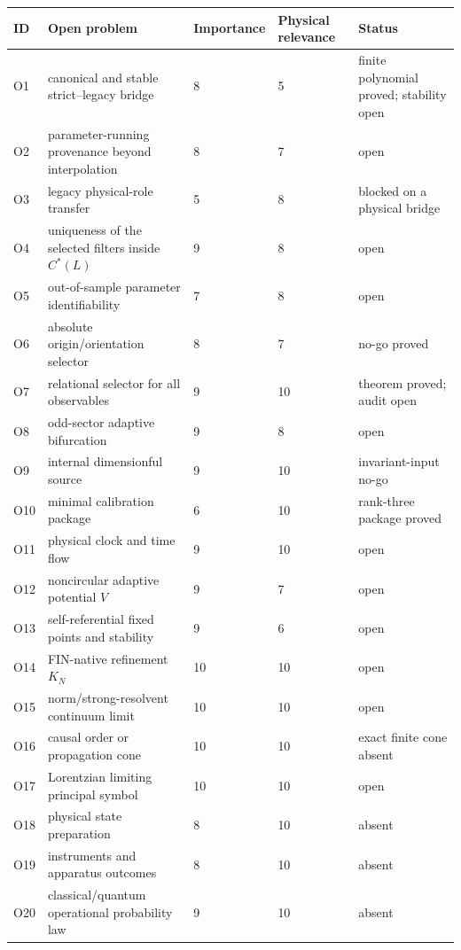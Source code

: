 \documentclass[11pt,a4paper,openany]{report}
\begin{document}
\begin{center}
\begingroup\footnotesize
\setlength{\tabcolsep}{3.5pt}
\renewcommand{\arraystretch}{1.16}
\begin{longtable}{@{}p{}p{}p{}p{}p{}@{}}
\toprule
\textbf{ID} & \textbf{Open problem} & \textbf{Importance} & \textbf{Physical relevance} & \textbf{Status} \\
\midrule
\endhead
O1 & canonical and stable strict–legacy bridge & 8 & 5 & finite polynomial proved; stability open \\
O2 & parameter-running provenance beyond interpolation & 8 & 7 & open \\
O3 & legacy physical-role transfer & 5 & 8 & blocked on a physical bridge \\
O4 & uniqueness of the selected filters inside \(C^*(L)\) & 9 & 8 & open \\
O5 & out-of-sample parameter identifiability & 7 & 8 & open \\
O6 & absolute origin/\allowbreak{}orientation selector & 8 & 7 & no-go proved \\
O7 & relational selector for all observables & 9 & 10 & theorem proved; audit open \\
O8 & odd-sector adaptive bifurcation & 9 & 8 & open \\
O9 & internal dimensionful source & 9 & 10 & invariant-input no-go \\
O10 & minimal calibration package & 6 & 10 & rank-three package proved \\
O11 & physical clock and time flow & 9 & 10 & open \\
O12 & noncircular adaptive potential \(V\) & 9 & 7 & open \\
O13 & self-referential fixed points and stability & 9 & 6 & open \\
O14 & FIN-native refinement \(K_N\) & 10 & 10 & open \\
O15 & norm/\allowbreak{}strong-resolvent continuum limit & 10 & 10 & open \\
O16 & causal order or propagation cone & 10 & 10 & exact finite cone absent \\
O17 & Lorentzian limiting principal symbol & 10 & 10 & open \\
O18 & physical state preparation & 8 & 10 & absent \\
O19 & instruments and apparatus outcomes & 8 & 10 & absent \\
O20 & classical/\allowbreak{}quantum operational probability law & 9 & 10 & absent \\

\end{longtable}
\end{center}
\end{document}

